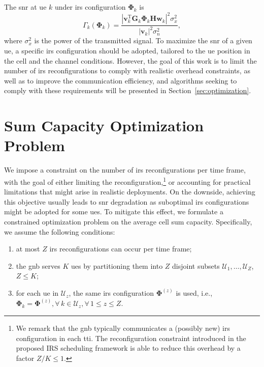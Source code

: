 The \gls{snr} at \gls{ue} $k$ under \gls{irs} configuration $\bm{\Phi}_k$ is
\begin{equation}\label{snr_k}
    \Gamma_k(\bm{\Phi}_k) = \frac{|\bm{v}_k^{\mathrm T} \bm{G}_k \bm{\Phi}_k \bm{H}  \bm{w}_k |^2\sigma_{x}^2}{|\bm{v}_k|^2\sigma_{n}^2},
\end{equation}
where $\sigma_{x}^2$ is the power of the transmitted signal.
To maximize the \gls{snr} of a given \gls{ue}, a specific \gls{irs} configuration should be adopted, tailored to the \gls{ue} position in the cell and the channel conditions.
However, the goal of this work is to limit the number of \gls{irs} reconfigurations to comply with realistic overhead constraints, as well as to improve the communication efficiency, and algorithms seeking to comply with these requirements will be presented in Section~\ref{sec:optimization}.

\section{Sum Capacity Optimization Problem}\label{sec:sumcapoptimization}

We impose a constraint on the number of \gls{irs} reconfigurations per time frame, with the goal of either limiting the reconfiguration,\footnote{We remark that the \gls{gnb} typically communicates a (possibly new) \gls{irs} configuration in each \gls{tti}. The reconfiguration constraint introduced in the proposed IRS scheduling framework is able to reduce this overhead by a factor ${Z}/{K} \leq 1$.} or accounting for practical limitations that might arise in realistic deployments.
On the downside, achieving this objective usually leads to \gls{snr} degradation as suboptimal \gls{irs} configurations might be adopted for some \glspl{ue}. To mitigate this effect, we formulate a constrained optimization problem on the average cell sum capacity.
Specifically, we assume the following conditions:
\begin{enumerate}[label=\arabic*.]
    \item at most $Z$ \gls{irs} reconfigurations can occur per time frame;
    \item the \gls{gnb} serves $K$ \glspl{ue} by partitioning them into $Z$ disjoint subsets $\mathcal{U}_1,\ldots,\mathcal{U}_{Z}$, $Z\leq K$;
    \item for each \gls{ue} in $\mathcal{U}_z$, the same \gls{irs} configuration $\bm{\Phi}^{(z)}$ is used, i.e., $\bm{\Phi}_k = \bm{\Phi}^{(z)}, \forall \, k \in \mathcal{U}_z, \forall \, 1\leq z \leq Z$.
\end{enumerate}

